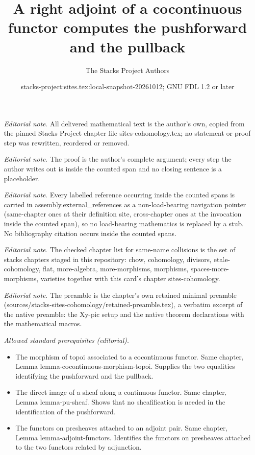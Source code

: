 \documentclass[10pt,a4paper]{amsart}
\title{A right adjoint of a cocontinuous functor computes the pushforward and the pullback}
\author{The Stacks Project Authors}
\date{stacks-project:sites.tex:local-snapshot-20261012; GNU FDL 1.2 or later}
\theoremstyle{plain}
\theoremstyle{definition}
\theoremstyle{remark}
\numberwithin{equation}{subsection}
\begin{document}
\maketitle
\noindent\textit{Editorial note.} All delivered mathematical text is the author's own, copied from the pinned Stacks Project chapter file sites-cohomology.tex; no statement or proof step was rewritten, reordered or removed.\par\medskip
\noindent\textit{Editorial note.} The proof is the author's complete argument; every step the author writes out is inside the counted span and no closing sentence is a placeholder.\par\medskip
\noindent\textit{Editorial note.} Every labelled reference occurring inside the counted spans is carried in assembly.external\_references as a non-load-bearing navigation pointer (same-chapter ones at their definition site, cross-chapter ones at the invocation inside the counted span), so no load-bearing mathematics is replaced by a stub. No bibliography citation occurs inside the counted spans.\par\medskip
\noindent\textit{Editorial note.} The checked chapter list for same-name collisions is the set of stacks chapters staged in this repository: chow, cohomology, divisors, etale-cohomology, flat, more-algebra, more-morphisms, morphisms, spaces-more-morphisms, varieties together with this card's chapter sites-cohomology.\par\medskip
\noindent\textit{Editorial note.} The preamble is the chapter's own retained minimal preamble (sources/stacks-sites-cohomology/retained-preamble.tex), a verbatim excerpt of the native preamble: the Xy-pic setup and the native theorem declarations with the mathematical macros.\par\medskip
\noindent\textit{Allowed standard prerequisites (editorial).}\begin{itemize}
\item The morphism of topoi associated to a cocontinuous functor. Same chapter, Lemma lemma-cocontinuous-morphism-topoi. Supplies the two equalities identifying the pushforward and the pullback.
\item The direct image of a sheaf along a continuous functor. Same chapter, Lemma lemma-pu-sheaf. Shows that no sheafification is needed in the identification of the pushforward.
\item The functors on presheaves attached to an adjoint pair. Same chapter, Lemma lemma-adjoint-functors. Identifies the functors on presheaves attached to the two functors related by adjunction.
\end{itemize}\medskip
\end{document}
